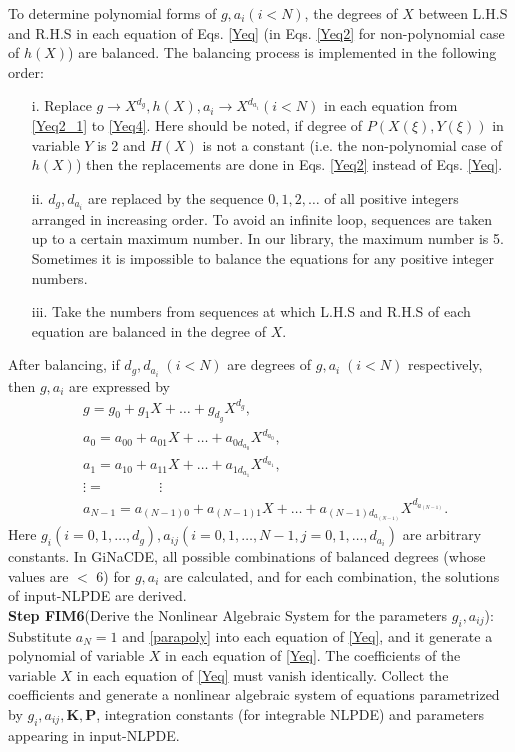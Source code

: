 \documentclass[prd,aps,floats,showkeys,nofootinbib,notitlepage]{revtex4-2}
\begin{document}
	To determine polynomial forms of $g,a_i(i<N)$, the degrees of $X$ between L.H.S and R.H.S in each equation of Eqs. \eqref{Yeq} (in Eqs. \eqref{Yeq2} for non-polynomial case of $h(X)$) are balanced. The balancing process is implemented in the following order:
	\begin{itemize}
		\item[i.] Replace $g\rightarrow X^{d_g},h(X),a_i\rightarrow X^{d_{a{_i}}}(i<N)$ in each equation from \eqref{Yeq2_1} to \eqref{Yeq4}. Here should be noted, if degree of $P(X(\xi),Y(\xi))$ in variable $Y$ is 2 and $H(X)$ is not a constant (i.e. the non-polynomial case of $h(X)$) then the replacements are done in Eqs. \eqref{Yeq2} instead of Eqs. \eqref{Yeq}.  
		\item[ii.]$d_g,d_{a_{i}}$ are replaced by the sequence $0,1, 2,\ldots$ of all positive integers arranged in increasing order. To avoid an infinite loop, sequences are taken up to a certain maximum number. In our library, the maximum number is 5. Sometimes it is impossible to balance the equations for any positive integer numbers. 
		\item[iii.] Take the numbers from sequences at which L.H.S and R.H.S of each equation are balanced in the degree of $X$.
	\end{itemize}
	After balancing, if $d_{g}, d_{a_{i}}\;(i<N)$ are degrees of $g,a_{i}\;(i<N)$ respectively, then $g,a_{i}$ are expressed by
	\begin{subequations}\label{parapoly}
		\begin{align}
			\label{gpoly}&g=g_0+g_1X+\ldots+g_{d_g}X^{d_g},\\
			\label{a0poly}&a_{0}=a_{00}+a_{01}X+\ldots+a_{0d_{a_{0}}}X^{d_{a_{0}}},\\
			\label{a1poly}&a_{1}=a_{10}+a_{11}X+\ldots+a_{1d_{a_{1}}}X^{d_{a_{1}}},\\
			&\vdots=\;\;\;\;\;\;\;\;\;\;\;\;\;\;\vdots\nonumber\\
			\label{aNminus1poly}&a_{N-1}=a_{(N-1)0}+a_{(N-1)1}X+\ldots+a_{(N-1)d_{a_{(N-1)}}}X^{d_{a_{(N-1)}}}.
		\end{align}
	\end{subequations}
	Here $g_i(i=0,1,\ldots,d_g),a_{ij}(i=0,1,\ldots,N-1,j=0,1,\ldots,d_{a_{i}})$ are arbitrary constants.
	In GiNaCDE, all possible combinations of balanced degrees (whose values are $<$ 6) for $g,a_i$ are calculated, and for each combination, the solutions of input-NLPDE are derived.\\
	
	
	\textbf{Step FIM6}(Derive the Nonlinear Algebraic System for the parameters $g_i,a_{ij}$): Substitute $a_N=1$ and \eqref{parapoly} into each equation of \eqref{Yeq}, and it generate a polynomial of variable $X$ in each equation of \eqref{Yeq}. The coefficients of the variable $X$ in each equation of \eqref{Yeq} must vanish identically. Collect the coefficients and generate a nonlinear algebraic system of equations parametrized by $g_i,a_{ij},\boldsymbol{K},\boldsymbol{P}$, integration constants (for integrable NLPDE) and parameters appearing in input-NLPDE.\\
	
\end{document}
